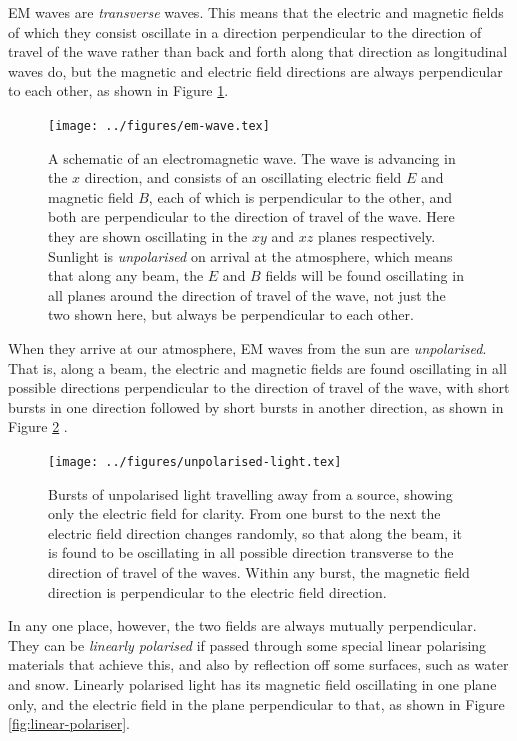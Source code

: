\documentclass[class=scrartcl, crop=false,parskip=half]{standalone}
\begin{document}
EM waves are \emph{transverse} waves. This means that the electric and magnetic fields of which they consist oscillate in a direction perpendicular to the direction of travel of the wave rather than back and forth along that direction as longitudinal waves do, but the magnetic and electric field directions are always perpendicular to each other, as shown in Figure \ref{fig:em-wave}. 

\begin{figure}
\centering
\texttt{[image: ../figures/em-wave.tex]}
\caption{A schematic of an electromagnetic wave. The wave is advancing in the $x$ direction, and consists of an oscillating electric field $E$ and magnetic field $B$, each of which is perpendicular to the other, and both are perpendicular to the direction of travel of the wave. Here they are shown oscillating in the $xy$ and $xz$ planes respectively. Sunlight is \emph{unpolarised} on arrival at the atmosphere, which means that along any beam, the $E$ and $B$ fields will be found oscillating in all planes around the direction of travel of the wave, not just the two shown here, but always be perpendicular to each other. }
\label{fig:em-wave}
\end{figure}

When they arrive at our atmosphere, EM waves from the sun are \emph{unpolarised}. That is, along a beam, the electric and magnetic fields are found oscillating in all possible directions perpendicular to the direction of travel of the wave, with short bursts in one direction followed by short bursts in another direction, as shown in Figure \ref{fig:unpolarised-light} . 

\begin{figure}
\centering
\texttt{[image: ../figures/unpolarised-light.tex]}
\caption{Bursts of unpolarised light travelling away from a source, showing only the electric field for clarity. From one burst to the next the electric field direction changes randomly, so that along the beam, it is found to be oscillating in all possible direction transverse to the direction of travel of the waves. Within any burst, the magnetic field direction is perpendicular to the electric field direction.}
\label{fig:unpolarised-light}
\end{figure}

In any one place, however, the two fields are always mutually perpendicular.  They can be \emph{linearly polarised} if passed through some special linear polarising materials that achieve this, and also by reflection off some surfaces, such as water and snow. Linearly polarised light has its magnetic field oscillating in one plane only, and the electric field in the plane perpendicular to that, as shown in Figure \ref{fig:linear-polariser}.
\end{document}
